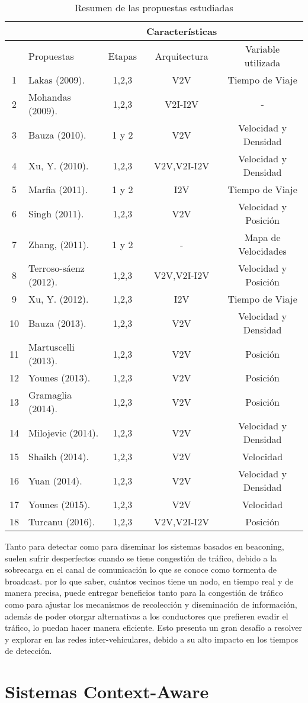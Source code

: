 \begin{table}[!htb]
\centering
\begin{tabular}{c l c c c}

\hline 
	&	& &Características \\
\hline 
	&Propuestas&	Etapas	&Arquitectura	&Variable utilizada \\
\hline
1&	Lakas (2009). &	1,2,3	& V2V	&Tiempo de Viaje \\
2&	Mohandas (2009). &	1,2,3	&V2I-I2V&	- \\
3&	Bauza (2010). &	1 y 2	&V2V	&Velocidad y Densidad \\
4&	Xu, Y. (2010).& 	1,2,3	&V2V,V2I-I2V	&Velocidad y Densidad \\
5&	Marfia (2011). &	1 y 2	&I2V	&Tiempo de Viaje \\
6&	Singh  (2011). &	1,2,3	&V2V	&Velocidad y Posición \\
7&	Zhang, (2011).& 	1 y 2	&-	&Mapa de Velocidades \\
8	&Terroso-sáenz (2012). 	&1,2,3	&V2V,V2I-I2V&	Velocidad y Posición\\
9&	Xu, Y. (2012).	&1,2,3&	I2V&	Tiempo de Viaje\\
10&Bauza  (2013).& 	1,2,3	&V2V	&Velocidad y Densidad\\
11&	Martuscelli  (2013).&	1,2,3	&V2V&	Posición\\
12	&Younes  (2013). 	&1,2,3	&V2V	&Posición\\
13	&Gramaglia (2014). 	&1,2,3	&V2V&	Posición\\
14	&Milojevic (2014). &	1,2,3&	V2V&	Velocidad y Densidad\\
15&	Shaikh (2014).& 	1,2,3	&V2V&	Velocidad\\
16	&Yuan  (2014). &	1,2,3	&V2V&	Velocidad y Densidad\\
17	&Younes (2015). 	&1,2,3	&V2V&	Velocidad\\
18	&Turcanu  (2016). &	1,2,3	&V2V,V2I-I2V	&Posición\\

\hline

\end{tabular}

\caption{Resumen de las propuestas estudiadas}
\label{tab:tabresumen}
\end{table}


Tanto para detectar como para diseminar  los sistemas basados en beaconing, suelen sufrir desperfectos cuando se tiene congestión de tráfico, debido a la sobrecarga en el canal de comunicación lo que se conoce como tormenta de broadcast. por lo que saber, cuántos vecinos tiene un nodo, en tiempo real y de manera precisa, puede entregar beneficios tanto para la congestión de tráfico como para ajustar los mecanismos de recolección y diseminación de información, además de poder otorgar alternativas a los conductores que prefieren evadir el tráfico, lo puedan hacer manera eficiente. Esto presenta un gran desafío a resolver y explorar en las redes inter-vehiculares, debido a su alto impacto en los tiempos de detección.

\section{Sistemas Context-Aware}

